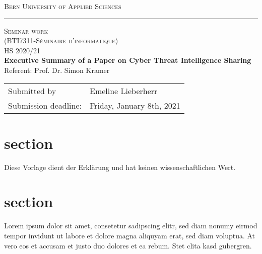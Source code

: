 \documentclass[12pt,a4paper]{article}
\begin{document}
\thispagestyle{empty}
\vspace*{-3cm}
\begin{center}
\large \textsc{Bern University of Applied Sciences}
\vspace{0.5cm}
\hrule
\vspace{5.5cm}
{\Large \textsc{Seminar work\\
(BTI7311-Séminaire d'informatique)}}\\
{\large HS 2020/21}\\
\vspace{1cm}
{\Large \bf
Executive Summary of a Paper on Cyber Threat Intelligence Sharing}\\
\vspace*{1cm}
{\large Referent:  Prof. Dr. Simon Kramer}
\end{center}
\vspace*{5cm}
{\large

\hspace*{7cm}
\parbox{8.2cm}
{
\begin{tabular}{ll}
Submitted by & Emeline Lieberherr\\

Submission deadline: & Friday, January 8th, 2021

\end{tabular}}}

\newpage
{}
\tableofcontents

\newpage
{}
\section{section}\label{intro}
Diese Vorlage dient der Erklärung und hat keinen wissenschaftlichen Wert.



\section{section}\label{body}
Lorem ipsum dolor sit amet, consetetur sadipscing elitr, sed diam nonumy eirmod tempor invidunt ut labore et dolore magna aliquyam erat, sed diam voluptua. At vero eos et accusam et justo duo dolores et ea rebum. Stet clita kasd gubergren.
\end{document}
